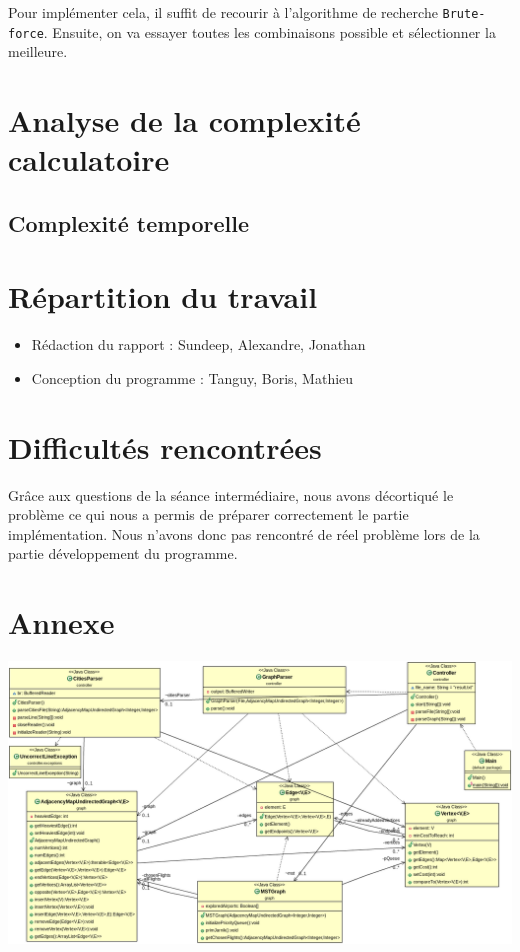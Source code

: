 \documentclass[11pt]{article}
\begin{document}
Pour implémenter cela, il suffit de recourir à l'algorithme de recherche \verb+Brute-force+. Ensuite, on va essayer toutes les combinaisons possible et sélectionner la meilleure.


\section{Analyse de la complexité calculatoire}
\subsection{Complexité temporelle}

\section{Répartition du travail}
\begin{itemize}
\item Rédaction du rapport : Sundeep, Alexandre, Jonathan
\item Conception du programme : Tanguy, Boris, Mathieu
\end{itemize}

\section{Difficultés rencontrées}
Grâce aux questions de la séance intermédiaire, nous avons décortiqué le problème ce qui nous a permis de préparer correctement le partie implémentation. Nous n'avons donc pas rencontré de réel problème lors de la partie développement du programme.
\newpage

\section{Annexe}
\begin{center}
\includegraphics[width=19.5cm, angle=90]{A.png}
\end{center}
\end{document}
